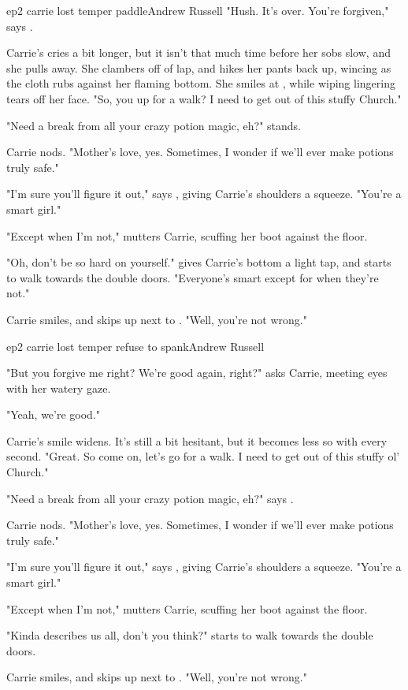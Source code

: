 \documentclass{book}
\begin{document}
\begin{childnode}{ep2 carrie lost temper paddle}{Andrew Russell}
    "Hush. It's over. You're forgiven," says \name{}. 

    Carrie's cries a bit longer, but it isn't that much time before her sobs slow, and she pulls away. She clambers off of \names{} lap, and hikes her pants back up, wincing as the cloth rubs 
    against her flaming bottom. She smiles at \name{}, while wiping lingering tears off her face. "So, you up for a walk? I need to get out of this stuffy Church."

    "Need a break from all your crazy potion magic, eh?" \name{} stands.

    Carrie nods. "Mother's love, yes. Sometimes, I wonder if we'll ever make potions truly safe."

    "I'm sure you'll figure it out," says \name{}, giving Carrie's shoulders a squeeze. "You're a smart girl."

    "Except when I'm not," mutters Carrie, scuffing her boot against the floor.

    "Oh, don't be so hard on yourself." \name{} gives Carrie's bottom a light tap, and starts to walk towards the double doors. "Everyone's smart except for when they're not."

    Carrie smiles, and skips up next to \name{}. "Well, you're not wrong."


\end{childnode}

\begin{childnode}{ep2 carrie lost temper refuse to spank}{Andrew Russell}

    "But you forgive me right? We're good again, right?" asks Carrie, meeting \names{} eyes with her watery gaze.

    \name{}  "Yeah, we're good."

    Carrie's smile widens. It's still a bit hesitant, but it becomes less so with every second. "Great. So come on, let's go for a walk. I need to get out of this stuffy ol' Church."

    "Need a break from all your crazy potion magic, eh?" says \name{}.

    Carrie nods. "Mother's love, yes. Sometimes, I wonder if we'll ever make potions truly safe."

    "I'm sure you'll figure it out," says \name{}, giving Carrie's shoulders a squeeze. "You're a smart girl."

    "Except when I'm not," mutters Carrie, scuffing her boot against the floor.

    "Kinda describes us all, don't you think?" \name{} starts to walk towards the double doors.

    Carrie smiles, and skips up next to \name{}. "Well, you're not wrong."


\end{childnode}
\end{document}
